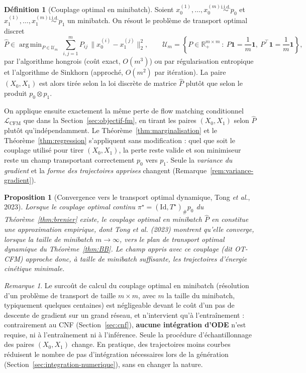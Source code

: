 \documentclass[11pt,a4paper]{article}
\theoremstyle{definition}
\newtheorem{definition}{Définition}[section]
\theoremstyle{plain}
\newtheorem{proposition}{Proposition}[section]
\theoremstyle{remark}
\newtheorem{remark}{Remarque}[section]
\newcommand{\R}{\mathbb{R}}
\newcommand{\Id}{\mathrm{Id}}
\DeclareMathOperator*{\argmin}{arg\,min}
\begin{document}
\begin{definition}[Couplage optimal en minibatch]
Soient $x_0^{(1)},\dots,x_0^{(m)}\overset{\text{i.i.d.}}{\sim}p_0$ et
$x_1^{(1)},\dots,x_1^{(m)}\overset{\text{i.i.d.}}{\sim}p_1$ un minibatch. On
résout le problème de transport optimal discret
\[
  \widehat{P} \in \argmin_{P\in\mathcal{U}_m}\ \sum_{i,j=1}^m P_{ij}\,\bigl\|x_0^{(i)}-x_1^{(j)}\bigr\|_2^2,
  \qquad
  \mathcal{U}_m = \left\{P\in\R_+^{m\times m}\ :\ P\mathbf{1}=\frac{1}{m}\mathbf{1},\ P^\top\mathbf{1}=\frac{1}{m}\mathbf{1}\right\},
\]
par l'algorithme hongrois (coût exact, $O(m^3)$) ou par régularisation
entropique et l'algorithme de Sinkhorn (approché, $O(m^2)$ par itération). La
paire $(X_0,X_1)$ est alors tirée selon la loi discrète de matrice $\widehat{P}$
plutôt que selon le produit $p_0\otimes p_1$.
\end{definition}

On applique ensuite exactement la même perte de flow matching conditionnel
$\mathcal{L}_{\mathrm{CFM}}$ que dans la Section~\ref{sec:objectif-fm}, en tirant les paires
$(X_0,X_1)$ selon $\widehat P$ plutôt qu'indépendamment. Le
Théorème~\ref{thm:marginalisation} et le Théorème~\ref{thm:regression}
s'appliquent sans modification : quel que soit le couplage utilisé pour tirer
$(X_0,X_1)$, la perte reste valide et son minimiseur reste un champ transportant
correctement $p_0$ vers $p_1$. Seule la \emph{variance du gradient} et la
\emph{forme des trajectoires apprises} changent (Remarque~\ref{rem:variance-gradient}).

\begin{proposition}[Convergence vers le transport optimal dynamique, {Tong \emph{et al.}, 2023}]\label{prop:otcfm-convergence}
Lorsque le couplage optimal continu $\pi^\star=(\Id,T^\star)_\#p_0$ du
Théorème~\ref{thm:brenier} existe, le couplage optimal en minibatch
$\widehat P$ en constitue une approximation empirique, dont Tong \emph{et al.}
(2023) montrent qu'elle converge, lorsque la taille de minibatch $m\to\infty$,
vers le plan de transport optimal dynamique du Théorème~\ref{thm:BB}. Le champ
appris avec ce couplage (dit OT-CFM) approche donc, à taille de minibatch
suffisante, les trajectoires d'énergie cinétique minimale.
\end{proposition}

\begin{remark}
Le surcoût de calcul du couplage optimal en minibatch (résolution d'un problème
de transport de taille $m\times m$, avec $m$ la taille du minibatch, typiquement
quelques centaines) est négligeable devant le coût d'un pas de descente de
gradient sur un grand réseau, et n'intervient qu'à l'entraînement : contrairement
au CNF (Section~\ref{sec:cnf}), \textbf{aucune intégration d'ODE} n'est requise,
ni à l'entraînement ni à l'inférence. Seule la procédure d'échantillonnage des
paires $(X_0,X_1)$ change. En pratique, des trajectoires moins courbes réduisent
le nombre de pas d'intégration nécessaires lors de la génération
(Section~\ref{sec:integration-numerique}), sans en changer la nature.
\end{remark}
\end{document}
